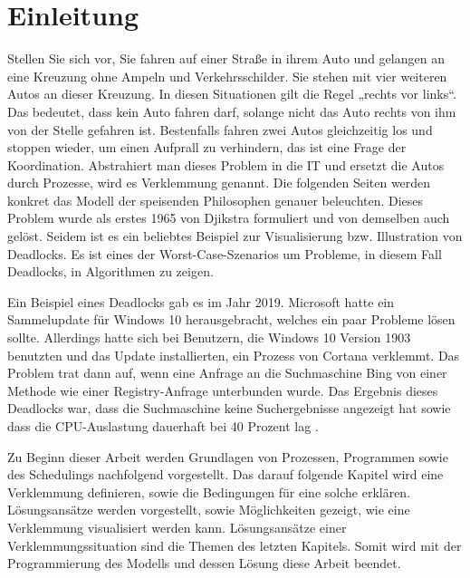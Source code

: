 \chapter{Einleitung}
\label{sec:Einleitung}
Stellen Sie sich vor, Sie fahren auf einer Straße in ihrem Auto und gelangen an eine Kreuzung ohne Ampeln und Verkehrsschilder. Sie stehen mit vier weiteren Autos an dieser Kreuzung. In diesen Situationen gilt die Regel „rechts vor links“. Das bedeutet, dass kein Auto fahren darf, solange nicht das Auto rechts von ihm von der Stelle gefahren ist. Bestenfalls fahren zwei Autos gleichzeitig los und stoppen wieder, um einen Aufprall zu verhindern, das ist eine Frage der Koordination.
Abstrahiert man dieses Problem in die IT und ersetzt die Autos durch Prozesse, wird es Verklemmung genannt.
Die folgenden Seiten werden konkret das Modell der speisenden Philosophen genauer beleuchten.
Dieses Problem wurde als erstes 1965 von Djikstra formuliert und von demselben auch gelöst. Seidem ist es ein beliebtes Beispiel zur Visualisierung bzw. Illustration von Deadlocks. Es ist eines der Worst-Case-Szenarios um Probleme, in diesem Fall Deadlocks, in Algorithmen zu zeigen.

Ein Beispiel eines Deadlocks gab es im Jahr 2019. Microsoft hatte ein Sammelupdate für Windows 10 herausgebracht, welches ein paar Probleme lösen sollte. Allerdings hatte sich bei Benutzern, die Windows 10 Version 1903 benutzten und das Update installierten, ein Prozess von Cortana verklemmt. Das Problem trat dann auf, wenn eine Anfrage an die Suchmaschine Bing von einer Methode wie einer Registry-Anfrage unterbunden wurde. Das Ergebnis dieses Deadlocks war, dass die Suchmaschine keine Suchergebnisse angezeigt hat sowie dass die CPU-Auslastung dauerhaft bei 40 Prozent lag \parencite[vgl.][]{bug}.
 
Zu Beginn dieser Arbeit werden Grundlagen von Prozessen, Programmen sowie des Schedulings nachfolgend vorgestellt. Das darauf folgende Kapitel wird eine Verklemmung definieren, sowie die Bedingungen für eine solche erklären. Lösungsansätze werden vorgestellt, sowie Möglichkeiten gezeigt, wie eine Verklemmung visualisiert werden kann. Lösungsansätze einer Verklemmungssituation sind die Themen des letzten Kapitels. Somit wird mit der Programmierung des Modells und dessen Lösung diese Arbeit beendet.  
 
